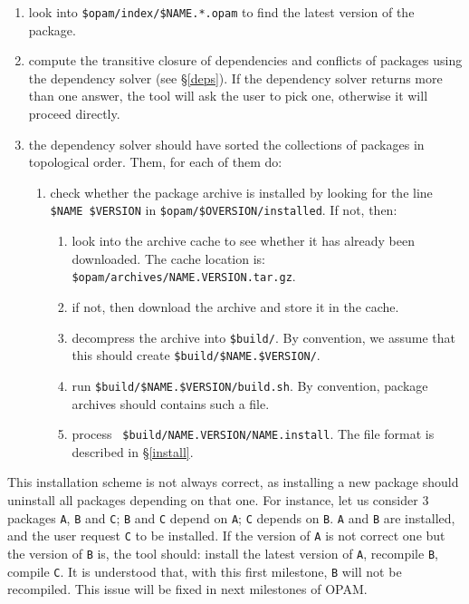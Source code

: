 \documentclass[a4paper,11pt]{article}
\newenvironment{remark}[1][Remark]{\begin{trivlist}
\item[\hskip \labelsep {\bfseries #1}]}{\end{trivlist}}
\begin{document}
\begin{enumerate}

\item look into \verb+$opam/index/$NAME.*.opam+ to find the latest
  version of the package.

\item compute the transitive closure of dependencies and conflicts of
  packages using the dependency solver (see \S\ref{deps}). If the
  dependency solver returns more than one answer, the tool will ask
  the user to pick one, otherwise it will proceed directly.

\item the dependency solver should have sorted the collections of
  packages in topological order. Them, for each of them do:

\begin{enumerate}

\item check whether the package archive is installed by looking for
  the line \verb+$NAME $VERSION+ in \verb+$opam/$OVERSION/installed+.
  If not, then:

\begin{enumerate}

\item look into the archive cache to see whether it has already been
  downloaded. The cache location is: {\tt
    \$opam/archives/NAME.VERSION.tar.gz}.

\item if not, then download the archive and store it in the cache.

\item decompress the archive into \verb+$build/+. By convention, we
  assume that this should create \verb+$build/$NAME.$VERSION/+.

\item run \verb+$build/$NAME.$VERSION/build.sh+. By convention, package
  archives should contains such a file.

\item process {\tt
  \$build/NAME.VERSION/NAME.install}\label{NAME.install}.  The file
  format is described in \S\ref{install}.

\end{enumerate}
\end{enumerate}
\end{enumerate}

\begin{remark}
This installation scheme is not always correct, as installing a new
package should uninstall all packages depending on that one. For
instance, let us consider 3 packages {\tt A}, {\tt B} and {\tt C};
{\tt B} and {\tt C} depend on {\tt A}; {\tt C} depends on {\tt B}.
{\tt A} and {\tt B} are installed, and the user request {\tt C} to be
installed. If the version of {\tt A} is not correct one but the
version of {\tt B} is, the tool should: install the latest version of
{\tt A}, recompile {\tt B}, compile {\tt C}. It is understood that,
with this first milestone, {\tt B} will not be recompiled. This issue
will be fixed in next milestones of OPAM.
\end{remark}
\end{document}
